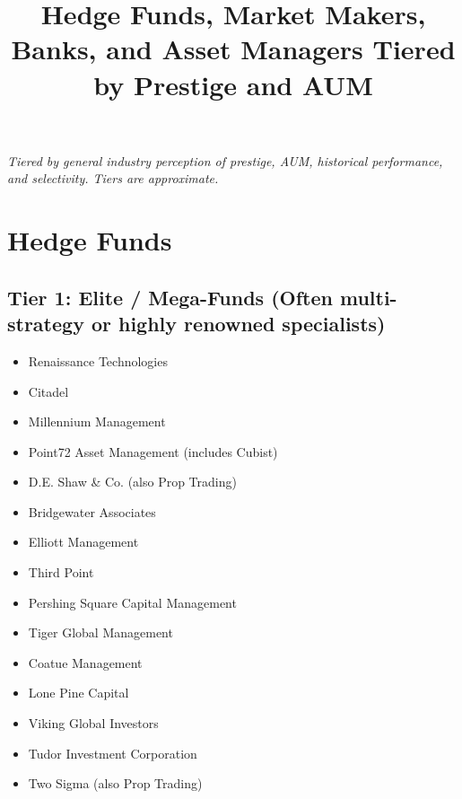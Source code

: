 \documentclass[11pt,a4paper]{article}
\title{Hedge Funds, Market Makers, Banks, and Asset Managers Tiered by Prestige and AUM}
\date{}
\begin{document}
\maketitle
\begin{center}
\footnotesize
\textit{Tiered by general industry perception of prestige, AUM, historical performance, and selectivity. Tiers are approximate.}
\end{center}

\section*{Hedge Funds}

\subsection*{Tier 1: Elite / Mega-Funds (Often multi-strategy or highly renowned specialists)}
\begin{multicols}{3}
\begin{itemize}[label=\textbullet, leftmargin=*, itemsep=1pt, parsep=0pt]
    \item Renaissance Technologies
    \item Citadel
    \item Millennium Management
    \item Point72 Asset Management (includes Cubist)
    \item D.E. Shaw \& Co. (also Prop Trading)
    \item Bridgewater Associates
    \item Elliott Management
    \item Third Point
    \item Pershing Square Capital Management
    \item Tiger Global Management
    \item Coatue Management
    \item Lone Pine Capital
    \item Viking Global Investors
    \item Tudor Investment Corporation
    \item Two Sigma (also Prop Trading)
\end{itemize}
\end{multicols}
\end{document}
